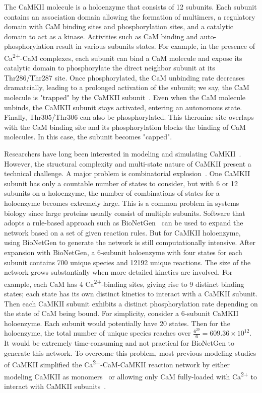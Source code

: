 \documentclass[10pt,letterpaper]{article}
\begin{document}
The CaMKII molecule is a holoenzyme that consists of 12 subunits. Each subunit contains an association domain allowing the formation of multimers, a regulatory domain with CaM binding sites and phosphorylation sites, and a catalytic domain to act as a kinase. Activities such as CaM binding and auto-phosphorylation result in various subunits states. For example, in the presence of Ca\textsuperscript{2+}-CaM complexes, each subunit can bind a CaM molecule and expose its catalytic domain to phosphorylate the direct neighbor subunit at its Thr286/Thr287 site. Once phosphorylated, the CaM unbinding rate decreases dramatcially, leading to a prolonged activation of the subunit; we say, the CaM molecule is "trapped" by the CaMKII subunit~\cite{Meyer:1992dp}. Even when the CaM molecule unbinds, the CaMKII subunit stays activated, entering an autonomous state. Finally, Thr305/Thr306 can also be phosphorylated. This theronine site overlaps with the CaM binding site and its phosphorylation blocks the binding of CaM molecules. In this case, the subunit becomes "capped". 

Researchers have long been interested in modeling and simulating CaMKII~\cite{Zhabotinsky:2000fp,Holmes:2000uk,Kubota:2001ul,Dupont:2003vq,Bhalla:2004cu,Lucic:2008gt,Zeng:2010bq,Pepke:2010ju,Michalski:2012ds}. However, the structural complexity and multi-state nature of CaMKII present a technical challenge. A major problem is combinatorial explosion~\cite{Stefan:2014gl}. One CaMKII subunit has only a countable number of states to consider, but with 6 or 12 subunits on a holoenzyme, the number of combinations of states for a holoenzyme becomes extremely large. This is a common problem in systems biology since large proteins usually consist of multiple subunits. Software that adopts a rule-based approach such as BioNetGen~\cite{Hlavacek:2006iq} can be used to expand the network based on a set of given reaction rules. But for CaMKII holoenzyme, using BioNetGen to generate the network is still computationally intensive. After expansion with BioNetGen, a 6-subunit holoenzyme with four states for each subunit contains 700 unique species and 12192 unique reactions. The size of the network grows substantially when more detailed kinetics are involved. For example, each CaM has 4 Ca\textsuperscript{2+}-binding sites, giving rise to 9 distinct binding states; each state has its own distinct kinetics to interact with a CaMKII subunit. Then each CaMKII subunit exhibits a distinct phosphorylation rate depending on the state of CaM being bound. For simplicity, consider a 6-subunit CaMKII holoenzyme. Each subunit would potentially have 20 states. Then for the holoenzyme, the total number of unique species reaches over $\frac{6^{20}}{6}=609.36\times10^{12}$. It would be extremely time-consuming and not practical for BioNetGen to generate this network. To overcome this problem, most previous modeling studies of CaMKII simplified the Ca\textsuperscript{2+}-CaM-CaMKII reaction network by either modeling CaMKII as monomers~\cite{Bhalla:2004cu,Pepke:2010ju} or allowing only CaM fully-loaded with Ca\textsuperscript{2+} to interact with CaMKII subunits~\cite{Zhabotinsky:2000fp,Kubota:2001ul,Dupont:2003vq,Michalski:2012ds}.
\end{document}
